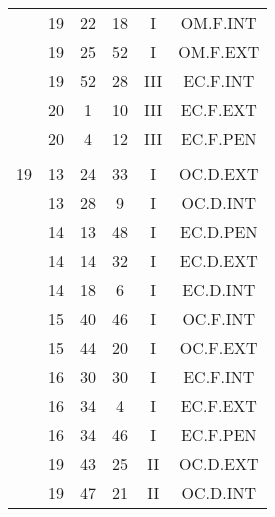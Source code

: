\documentclass[12pt, a4paper]{article}
\begin{document}
\begin{multicols}{3}
{\begin{tabular}{c c c c c c}
	 	 	 	 & 19 & 22 & 18 & I & OM.F.INT\\%
	 	 	 	 & 19 & 25 & 52 & I & OM.F.EXT\\%
	 	 	 	 & 19 & 52 & 28 & III & EC.F.INT\\%
	 	 	 	 & 20 & 1 & 10 & III & EC.F.EXT\\%
	 	 	 	 & 20 & 4 & 12 & III & EC.F.PEN\\%
	 	 	 	 & & & & & \\%
	 	 	 	19 & 13 & 24 & 33 & I & OC.D.EXT\\%
	 	 	 	 & 13 & 28 & 9 & I & OC.D.INT\\%
	 	 	 	 & 14 & 13 & 48 & I & EC.D.PEN\\%
	 	 	 	 & 14 & 14 & 32 & I & EC.D.EXT\\%
	 	 	 	 & 14 & 18 & 6 & I & EC.D.INT\\%
	 	 	 	 & 15 & 40 & 46 & I & OC.F.INT\\%
	 	 	 	 & 15 & 44 & 20 & I & OC.F.EXT\\%
	 	 	 	 & 16 & 30 & 30 & I & EC.F.INT\\%
	 	 	 	 & 16 & 34 & 4 & I & EC.F.EXT\\%
	 	 	 	 & 16 & 34 & 46 & I & EC.F.PEN\\%
	 	 	 	 & 19 & 43 & 25 & II & OC.D.EXT\\%
	 	 	 	 & 19 & 47 & 21 & II & OC.D.INT\\%
	 	 \end{tabular}
 	}
\end{multicols}
\end{document}
